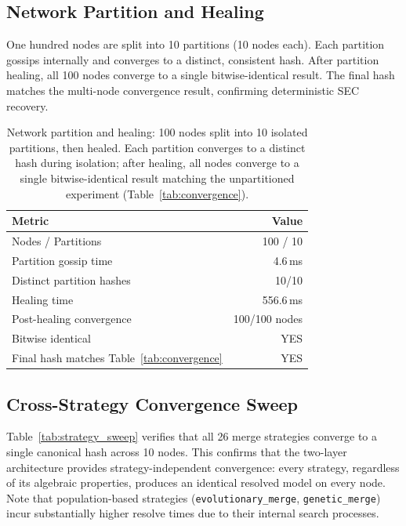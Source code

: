 \documentclass[10pt,letterpaper]{article}
\begin{document}
\subsection{Network Partition and Healing}

One hundred nodes are split into 10 partitions (10 nodes each).
Each partition gossips internally and converges to a distinct, consistent hash.
After partition healing, all 100 nodes converge to a single bitwise-identical result.
The final hash matches the multi-node convergence result, confirming deterministic SEC recovery.

\begin{table}[htbp]
\centering
\caption{Network partition and healing: 100 nodes split into 10 isolated partitions, then healed.
Each partition converges to a distinct hash during isolation; after healing, all nodes converge to a single bitwise-identical result matching the unpartitioned experiment (Table~\ref{tab:convergence}).}
\label{tab:partition}
\footnotesize
\begin{tabular}{lr}
\toprule
Metric & Value \\
\midrule
Nodes / Partitions & 100 / 10 \\
Partition gossip time & 4.6\,ms \\
Distinct partition hashes & 10/10 \\
Healing time & 556.6\,ms \\
Post-healing convergence & 100/100 nodes \\
Bitwise identical & YES \\
Final hash matches Table~\ref{tab:convergence} & YES \\
\bottomrule
\end{tabular}
\end{table}

\subsection{Cross-Strategy Convergence Sweep}

Table~\ref{tab:strategy_sweep} verifies that all 26 merge strategies converge to a single canonical hash across 10 nodes.
This confirms that the two-layer architecture provides strategy-independent convergence: every strategy, regardless of its algebraic properties, produces an identical resolved model on every node.
Note that population-based strategies (\texttt{evolutionary\_merge}, \texttt{genetic\_merge}) incur substantially higher resolve times due to their internal search processes.
\end{document}
